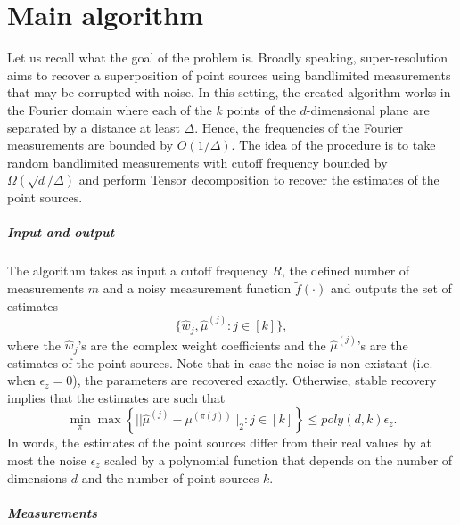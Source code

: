 \chapter{Main algorithm}
Let us recall what the goal of the problem is. Broadly speaking, super-resolution aims to recover a superposition of point sources using bandlimited measurements that may be corrupted with noise. In this setting, the created algorithm works in the Fourier domain where each of the $k$ points of the $d$-dimensional plane are separated by a distance at least $\Delta$. Hence, the frequencies of the Fourier measurements are bounded by $O(1/\Delta)$. The idea of the procedure is to take random bandlimited measurements with cutoff frequency bounded by $\Omega(\sqrt{d}/\Delta)$ and perform Tensor decomposition to recover the estimates of the point sources.\paragraph{Input and output} The algorithm takes as input a cutoff frequency $R$, the defined number of measurements $m$ and a noisy measurement function $\tilde{f}(\cdot)$ and outputs the set of estimates $$\{\widehat{w}_j,\widehat{\mu}^{(j)}:j\in[k]\},$$ where the $\widehat{w}_j$'s are the complex weight coefficients and the $\widehat{\mu}^{(j)}$'s are the estimates of the point sources. Note that in case the noise is non-existant (i.e. when $\epsilon_z=0$), the parameters are recovered exactly. Otherwise, stable recovery implies that the estimates are such that $$\min_\pi\max\left\{||\widehat{\mu}^{(j)}-\mu^{(\pi(j))}||_2:j\in[k]\right\}\leq poly(d,k)\epsilon_z.$$ In words, the estimates of the point sources differ from their real values by at most the noise $\epsilon_z$ scaled by a polynomial function that depends on the number of dimensions $d$ and the number of point sources $k$.
\paragraph{Measurements}